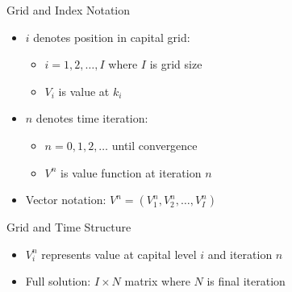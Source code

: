 \documentclass[]{beamer}
\begin{document}
\begin{frame}{Grid and Index Notation}
    \begin{itemize}
        \item $i$ denotes position in capital grid:
        \begin{itemize}
            \item $i = 1,2,\ldots,I$ where $I$ is grid size
            \item $V_i$ is value at $k_i$
        \end{itemize}
        \item $n$ denotes time iteration:
        \begin{itemize}
            \item $n = 0,1,2,\ldots$ until convergence
            \item $V^n$ is value function at iteration $n$
        \end{itemize}
        \item Vector notation: $V^n = (V_1^n, V_2^n, \ldots, V_I^n)$
    \end{itemize}
    
\end{frame}


\begin{frame}{Grid and Time Structure}
    \begin{center}
    \end{center}
    \begin{itemize}
        \item $V_i^n$ represents value at capital level $i$ and iteration $n$
        \item Full solution: $I \times N$ matrix where $N$ is final iteration
    \end{itemize}
\end{frame}
\end{document}
